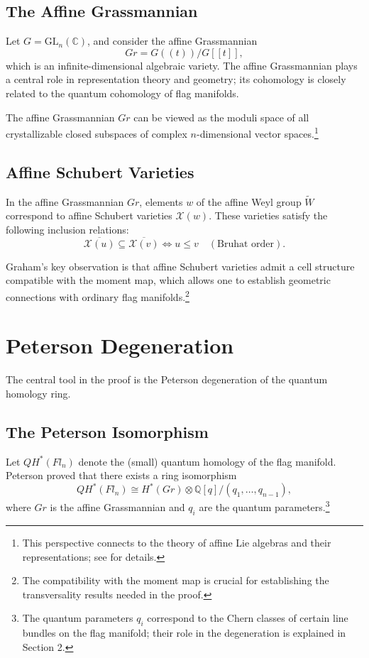 \subsection{The Affine Grassmannian}

Let $G = \mathrm{GL}_n(\mathbb{C})$, and consider the affine Grassmannian
$$Gr = G(\!(t)\!)/G[[t]],$$
which is an infinite-dimensional algebraic variety. The affine Grassmannian plays a central role in representation theory and geometry; its cohomology is closely related to the quantum cohomology of flag manifolds.

The affine Grassmannian $Gr$ can be viewed as the moduli space of all crystallizable closed subspaces of complex $n$-dimensional vector spaces.\footnote{This perspective connects to the theory of affine Lie algebras and their representations; see \cite{Gr} for details.}

\subsection{Affine Schubert Varieties}

In the affine Grassmannian $Gr$, elements $w$ of the affine Weyl group $\widetilde{W}$ correspond to affine Schubert varieties $\mathcal{X}(w)$. These varieties satisfy the following inclusion relations:
$$\overline{\mathcal{X}(u)} \subseteq \overline{\mathcal{X}(v)} \iff u \leq v \quad (\text{Bruhat order}).$$

Graham's key observation is that affine Schubert varieties admit a cell structure compatible with the moment map, which allows one to establish geometric connections with ordinary flag manifolds.\footnote{The compatibility with the moment map is crucial for establishing the transversality results needed in the proof.}

\section{Peterson Degeneration}

The central tool in the proof is the Peterson degeneration of the quantum homology ring.

\subsection{The Peterson Isomorphism}

Let $QH^*(Fl_n)$ denote the (small) quantum homology of the flag manifold. Peterson proved that there exists a ring isomorphism
$$QH^*(Fl_n) \cong H^*(Gr) \otimes \mathbb{Q}[q] / (q_1, \ldots, q_{n-1}),$$
where $Gr$ is the affine Grassmannian and $q_i$ are the quantum parameters.\footnote{The quantum parameters $q_i$ correspond to the Chern classes of certain line bundles on the flag manifold; their role in the degeneration is explained in \cite{Gr} Section 2.}

